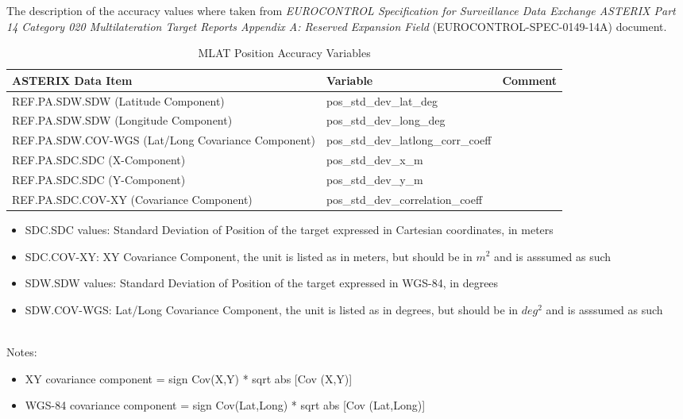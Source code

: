 The description of the accuracy values where taken from \textit{EUROCONTROL Specification for Surveillance Data Exchange ASTERIX Part 14 Category 020 Multilateration Target Reports Appendix A: Reserved Expansion Field} (EUROCONTROL-SPEC-0149-14A) document.

\begin{center}
 \begin{table}[H]
  \begin{tabularx}{\textwidth}{ | X | l | l | }
    \hline
    \textbf{ASTERIX Data Item} & \textbf{Variable} & \textbf{Comment} \\ \hline
     REF.PA.SDW.SDW (Latitude Component) & pos\_std\_dev\_lat\_deg &  \\ \hline
     REF.PA.SDW.SDW (Longitude Component) & pos\_std\_dev\_long\_deg  &  \\ \hline
     REF.PA.SDW.COV-WGS (Lat/Long Covariance Component) & pos\_std\_dev\_latlong\_corr\_coeff  &  \\ \hline
     REF.PA.SDC.SDC (X-Component) & pos\_std\_dev\_x\_m &  \\ \hline
     REF.PA.SDC.SDC (Y-Component) & pos\_std\_dev\_y\_m  &  \\ \hline
     REF.PA.SDC.COV-XY (Covariance Component) & pos\_std\_dev\_correlation\_coeff  &  \\ \hline
\end{tabularx}
  \caption{MLAT Position Accuracy Variables}
\end{table}
\end{center}

\begin{itemize}
\item SDC.SDC values: Standard Deviation of Position of the target expressed in Cartesian coordinates, in meters
\item SDC.COV-XY: XY Covariance Component, the unit is listed as in meters, but should be in $m^2$ and is asssumed as such
\item SDW.SDW values: Standard Deviation of Position of the target expressed in WGS-84, in degrees
\item SDW.COV-WGS: Lat/Long Covariance Component, the unit is listed as in degrees, but should be in $deg^2$ and is asssumed as such
\end{itemize}
\ \\

Notes:
\begin{itemize}
\item XY covariance component = sign {Cov(X,Y)} * sqrt {abs [Cov (X,Y)]}
\item WGS-84 covariance component = sign {Cov(Lat,Long)} * sqrt {abs [Cov (Lat,Long)]}
\end{itemize}

